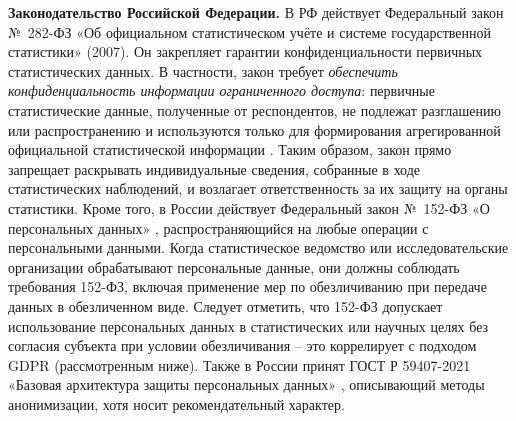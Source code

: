 \textbf{Законодательство Российской Федерации.} В
РФ действует Федеральный закон № 282-ФЗ «Об официальном статистическом учёте и системе государственной статистики»
(2007). Он закрепляет гарантии конфиденциальности первичных статистических данных. В частности, закон требует
\textit{обеспечить конфиденциальность информации ограниченного доступа}: первичные статистические данные, полученные от
респондентов, не подлежат разглашению или распространению и используются только для формирования агрегированной
официальной статистической информации \autocite{rg-ru}. Таким образом, закон прямо запрещает раскрывать индивидуальные
сведения, собранные в ходе статистических наблюдений, и возлагает ответственность за их защиту на органы статистики.
Кроме того, в России действует Федеральный закон № 152-ФЗ «О персональных данных» \autocite{FZ152}, распространяющийся
на любые операции с персональными данными. Когда статистическое ведомство или исследовательские организации обрабатывают
персональные данные, они должны соблюдать требования 152-ФЗ, включая применение мер по обезличиванию при передаче данных
в обезличенном виде. Следует отметить, что 152-ФЗ допускает использование персональных данных в статистических или
научных целях без согласия субъекта при условии обезличивания – это коррелирует с подходом GDPR (рассмотренным ниже).
Также в России принят ГОСТ Р 59407-2021 «Базовая архитектура защиты персональных данных» \autocite{GOST}, описывающий
методы анонимизации, хотя носит рекомендательный характер.

